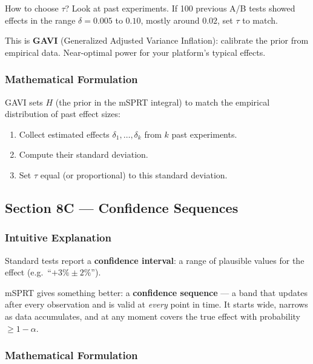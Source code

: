 \documentclass[12pt, a4paper]{article}
\begin{document}
\begin{intuition}
How to choose $\tau$?  Look at past experiments.  If 100 previous A/B tests
showed effects in the range $\delta = 0.005$ to $0.10$, mostly around $0.02$,
set $\tau$ to match.

This is \textbf{GAVI} (Generalized Adjusted Variance Inflation): calibrate the
prior from empirical data. Near-optimal power for your platform's typical
effects.
\end{intuition}

\subsubsection*{Mathematical Formulation}

GAVI sets $H$ (the prior in the mSPRT integral) to match the empirical
distribution of past effect sizes:
\begin{enumerate}[nosep]
  \item Collect estimated effects $\delta_1, \ldots, \delta_k$ from $k$
        past experiments.
  \item Compute their standard deviation.
  \item Set $\tau$ equal (or proportional) to this standard deviation.
\end{enumerate}

\subsection{Section 8C --- Confidence Sequences}

\subsubsection*{Intuitive Explanation}

\begin{intuition}
Standard tests report a \textbf{confidence interval}: a range of plausible
values for the effect (e.g.\ ``$+3\% \pm 2\%$'').

mSPRT gives something better: a \textbf{confidence sequence} --- a band that
updates after every observation and is valid at \emph{every} point in time.
It starts wide, narrows as data accumulates, and at any moment covers the true
effect with probability $\geq 1-\alpha$.
\end{intuition}

\subsubsection*{Mathematical Formulation}
\end{document}
